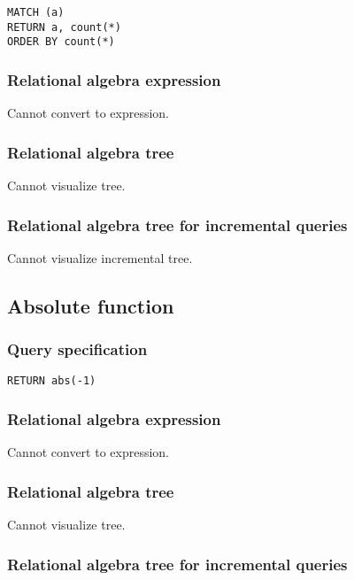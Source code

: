 \begin{lstlisting}
MATCH (a)
RETURN a, count(*)
ORDER BY count(*)
\end{lstlisting}

\subsubsection*{Relational algebra expression}

Cannot convert to expression.

\subsubsection*{Relational algebra tree}

Cannot visualize tree.

\subsubsection*{Relational algebra tree for incremental queries}

Cannot visualize incremental tree.

\subsection{Absolute function}

\subsubsection*{Query specification}

\begin{lstlisting}
RETURN abs(-1)
\end{lstlisting}

\subsubsection*{Relational algebra expression}

Cannot convert to expression.

\subsubsection*{Relational algebra tree}

Cannot visualize tree.

\subsubsection*{Relational algebra tree for incremental queries}

